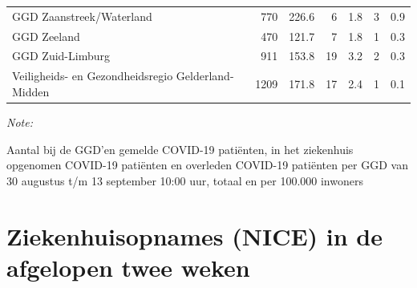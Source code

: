 \documentclass[
  english,
  man,floatsintext]{apa6}
\begin{document}
\begin{table}
\begin{threeparttable}
\begin{tabular}{lrrrrrr}
GGD Zaanstreek/Waterland & 770 & 226.6 & 6 & 1.8 & 3 & 0.9\\
GGD Zeeland & 470 & 121.7 & 7 & 1.8 & 1 & 0.3\\
GGD Zuid-Limburg & 911 & 153.8 & 19 & 3.2 & 2 & 0.3\\
Veiligheids- en Gezondheidsregio Gelderland-Midden & 1209 & 171.8 & 17 & 2.4 & 1 & 0.1\\
\bottomrule
\end{tabular}
\begin{tablenotes}
\item \textit{Note: } 
\item Aantal bij de GGD’en gemelde COVID-19 patiënten, in het ziekenhuis opgenomen COVID-19 patiënten en overleden COVID-19 patiënten per GGD van 30 augustus t/m 13 september 10:00 uur, totaal en per 100.000 inwoners
\end{tablenotes}
\end{threeparttable}
\endgroup{}
\end{table}

\newpage

\hypertarget{ziekenhuisopnames-nice-in-de-afgelopen-twee-weken}{%
\section{Ziekenhuisopnames (NICE) in de afgelopen twee weken}\label{ziekenhuisopnames-nice-in-de-afgelopen-twee-weken}}
\end{document}
